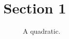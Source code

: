 \documentclass[example-with-subfiles.tex]{subfiles}
\begin{document}
    \section{Section 1}

    \begin{figure}[h]
		\caption{A quadratic.}
		\label{fig:quadratic}
	\end{figure}

\end{document}
